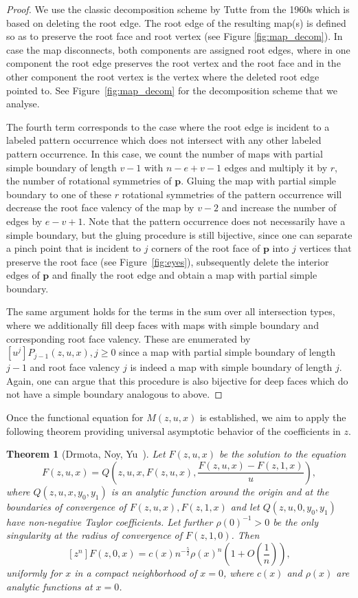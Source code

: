 \documentclass[reqno, 11pt]{amsart}
\newtheorem{theorem}{Theorem}
\theoremstyle{definition}
\theoremstyle{remark}
\newcommand{\map}[1]{\textbf{#1}}
\numberwithin{equation}{section}
\begin{document}
\begin{proof}
    We use the classic decomposition scheme by Tutte from the 1960s \cite{tutte_1963} which is based on deleting the root edge. The root edge of the resulting map(s) is defined so as to preserve the root face and root vertex (see Figure \ref{fig:map_decom}). 
    In case the map disconnects, both components are assigned root edges, where in one component the root edge preserves the root vertex and the root face and in the other component the root vertex is the vertex where the deleted root edge pointed to. See Figure~\ref{fig:map_decom} for the decomposition scheme that we analyse. 

    The fourth term corresponds to the case where the root edge is incident to a labeled pattern occurrence which does not intersect with any other labeled pattern occurrence. In this case, we count the number of maps with partial simple boundary of length $v-1$ with $n-e+v-1$ edges and multiply it by $r$, the number of rotational symmetries of $\map{p}$. Gluing the map with partial simple boundary to one of these $r$ rotational symmetries of the pattern occurrence will decrease the root face valency of the map by $v-2$ and increase the number of edges by $e-v+1$. Note that the pattern occurrence does not necessarily have a simple boundary, but the gluing procedure is still bijective, since one can separate a pinch point that is incident to $j$ corners of the root face of $\map{p}$ into $j$ vertices that preserve the root face (see Figure~\ref{fig:eyes}), subsequently delete the interior edges of $\map{p}$ and finally the root edge and obtain a map with partial simple boundary.

    The same argument holds for the terms in the sum over all intersection types, where we additionally fill deep faces with maps with simple boundary and corresponding root face valency. These are enumerated by $[u^j]P_{j-1}(z,u,x), j\geq 0$ since a map with partial simple boundary of length $j-1$ and root face valency $j$ is indeed a map with simple boundary of length $j$. Again, one can argue that this procedure is also bijective for deep faces which do not have a simple boundary analogous to above.
\end{proof}

Once the functional equation for $M(z,u,x)$ is established, we aim to apply the following theorem providing universal asymptotic behavior of the coefficients in $z$. 

\begin{theorem}[Drmota, Noy, Yu~\cite{DrmotaNoyYu}]\label{thm:dny}
    Let $F(z,u,x)$ be the solution to the equation
    \[
        F(z,u,x) = Q\left(z,u,x,F(z,u,x),\frac{F(z,u,x)-F(z,1,x)}{u}\right),
    \]
    where $Q(z,u,x,y_0,y_1)$ is an analytic function around the origin and at the boundaries of convergence of $F(z,u,x), F(z,1,x)$ and let $Q(z,u,0,y_0,y_1)$ have non-negative Taylor coefficients. Let further $\rho(0)^{-1}>0$ be the only singularity at the radius of convergence of $F(z,1,0)$. Then
    \[
        [z^n]F(z,0,x) = c(x)n^{-\frac{5}{2}}\rho(x)^n\left(1+O\left(\frac{1}{n}\right)\right),
    \]
    uniformly for $x$ in a compact neighborhood of $x=0$, where $c(x)$ and $\rho(x)$ are analytic functions at $x=0$.
\end{theorem}
\end{document}
